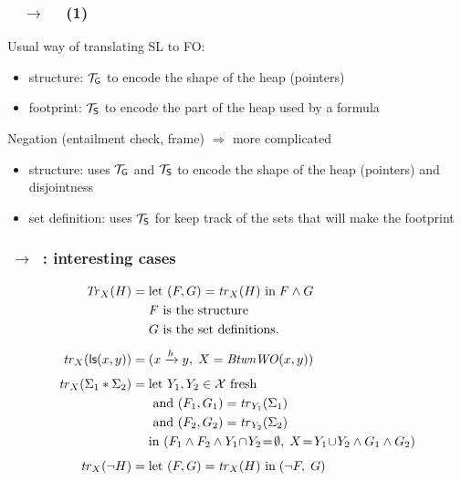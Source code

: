 \documentclass{beamer}
\begin{document}
\begin{frame}
  \frametitle{\JoshLogic $\quad \rightarrow \quad$ \LRJQ (1)}

  Usual way of translating SL to FO:
  \begin{itemize}
  \item structure: $\mathcal{T}_{\mathsf{G}}$ to encode the shape of the heap (pointers)
  \item footprint: $\mathcal{T}_{\mathsf{S}}$ to encode the part of the heap used by a formula
  \end{itemize}

  \vspace{2ex}
  
  Negation (entailment check, frame) $\Rightarrow$ more complicated 
  \begin{itemize}
  \item structure: uses $\mathcal{T}_{\mathsf{G}}$ and $\mathcal{T}_{\mathsf{S}}$ to encode the shape of the heap (pointers) and disjointness
  \item set definition: uses $\mathcal{T}_{\mathsf{S}}$ for keep track of the sets that will make the footprint
  \end{itemize}
  
\end{frame}

\begin{frame}
  \frametitle{\JoshLogic $\ \rightarrow \ $ \LRJQ : interesting cases}
  \begin{align*}
    \trfull{H}{X} = {} & \letin{(F,G)}{\tr_X(H)} \; F \land G \\
    {} & \text{$F$ is the structure} \\
    {} & \text{$G$ is the set definitions.} \\[1ex]
    \tr_{X}(\ls(x,y)) = {} & (\reach{x}{y},\;  X = \BtwnWO(x,y)) \\[1ex]
    \tr_{X}(\Sigma_1 * \Sigma_2) = {} &
    \text{let } \text{$Y_1,Y_2 \in \vars$ fresh } \\
    & \text{ and } (F_1,G_1) = \tr_{Y_1}(\Sigma_1) \\
    & \text{ and } (F_2,G_2) = \tr_{Y_2}(\Sigma_2)\\
    & \text{in } (F_1 \land F_2 \land Y_1\!\cap\!Y_2\!=\!\emptyset,\;     X\!=\!Y_1\!\cup\!Y_2 \land G_1 \land G_2)\\[1ex]
    \tr_X(\neg H) = {} &
    \letin{(F,G)}{\tr_{X}(H)} \; (\neg F,\; G)
  \end{align*}
  
  
\end{frame}
\end{document}

